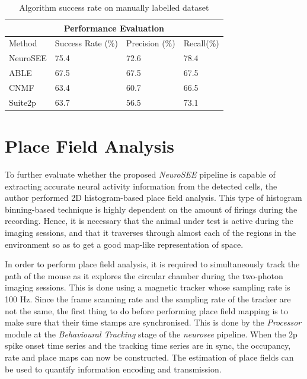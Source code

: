 \begin{table}[t]
\centering
\begin{tabular}{ |p{2.5cm}||p{3.5cm}|p{3cm}|p{3cm}| }
 	\hline
	 \multicolumn{4}{|c|}{Performance Evaluation} \\
 	\hline
 	Method &Success Rate (\%) &Precision (\%)&Recall(\%)\\
	 \hline
 	NeuroSEE   & 75.4 & 72.6 & 78.4\\
 	ABLE   & 67.5 & 67.5 & 67.5\\
 	CNMF   & 63.4 & 60.7 & 66.5\\
 	Suite2p   & 63.7 & 56.5 & 73.1\\
	\hline
\end{tabular}
\caption{Algorithm success rate on manually labelled dataset}
\label{table:Table1}
\end{table}




\section{Place Field Analysis}
\hspace{\parindent} To further evaluate whether the proposed \textit{NeuroSEE} pipeline is capable of extracting accurate neural activity information from the detected cells, the author performed 2D histogram-based place field analysis. This type of histogram binning-based technique is highly dependent on the amount of firings during the recording. Hence, it is necessary that the animal under test is active during the imaging sessions, and that it traverses through almost each of the regions in the environment so as to get a good map-like representation of space.  

In order to perform place field analysis, it is required to simultaneously track the path of the mouse as it explores the circular chamber during the two-photon imaging sessions. This is done using a magnetic tracker whose sampling rate is 100 Hz. Since the frame scanning rate and the sampling rate of the tracker are not the same, the first thing to do before performing place field mapping is to make sure that their time stamps are synchronised. This is done by the \textit{Processor} module at the \textit{Behavioural Tracking} stage of the \textit{\ac{neurosee}} pipeline. When the \ac{2p} spike onset time series and the tracking time series are in sync, the occupancy, rate and place maps can now be constructed. The estimation of place fields can be used to quantify information encoding and transmission. 

